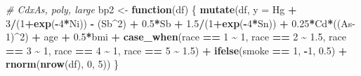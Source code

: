 \documentclass[12pt, twoside]{amherstthesis}
\newenvironment{Shaded}{\begin{snugshade}}{\end{snugshade}}
\newcommand{\AttributeTok}[1]{\textcolor[rgb]{0.13,0.29,0.53}{#1}}
\newcommand{\CommentTok}[1]{\textcolor[rgb]{0.56,0.35,0.01}{\textit{#1}}}
\newcommand{\ControlFlowTok}[1]{\textcolor[rgb]{0.13,0.29,0.53}{\textbf{#1}}}
\newcommand{\DecValTok}[1]{\textcolor[rgb]{0.00,0.00,0.81}{#1}}
\newcommand{\FloatTok}[1]{\textcolor[rgb]{0.00,0.00,0.81}{#1}}
\newcommand{\FunctionTok}[1]{\textcolor[rgb]{0.13,0.29,0.53}{\textbf{#1}}}
\newcommand{\NormalTok}[1]{#1}
\newcommand{\OtherTok}[1]{\textcolor[rgb]{0.56,0.35,0.01}{#1}}
\newcommand{\SpecialCharTok}[1]{\textcolor[rgb]{0.81,0.36,0.00}{\textbf{#1}}}
\begin{document}
\begin{Shaded}
\begin{Highlighting}[]
\CommentTok{\# CdxAs, poly, large}
\NormalTok{bp2 }\OtherTok{\textless{}{-}} \ControlFlowTok{function}\NormalTok{(df) \{}
  \FunctionTok{mutate}\NormalTok{(df, }\AttributeTok{y =} 
\NormalTok{           Hg }\SpecialCharTok{+} \DecValTok{3}\SpecialCharTok{/}\NormalTok{(}\DecValTok{1}\SpecialCharTok{+}\FunctionTok{exp}\NormalTok{(}\SpecialCharTok{{-}}\DecValTok{4}\SpecialCharTok{*}\NormalTok{Ni)) }\SpecialCharTok{{-}}\NormalTok{ (Sb}\SpecialCharTok{\^{}}\DecValTok{2}\NormalTok{) }\SpecialCharTok{+} \FloatTok{0.5}\SpecialCharTok{*}\NormalTok{Sb }\SpecialCharTok{+} \FloatTok{1.5}\SpecialCharTok{/}\NormalTok{(}\DecValTok{1}\SpecialCharTok{+}\FunctionTok{exp}\NormalTok{(}\SpecialCharTok{{-}}\DecValTok{4}\SpecialCharTok{*}\NormalTok{Sn)) }\SpecialCharTok{+} 
           \FloatTok{0.25}\SpecialCharTok{*}\NormalTok{Cd}\SpecialCharTok{*}\NormalTok{((As}\DecValTok{{-}1}\NormalTok{)}\SpecialCharTok{\^{}}\DecValTok{2}\NormalTok{) }\SpecialCharTok{+}
\NormalTok{           age }\SpecialCharTok{+} \FloatTok{0.5}\SpecialCharTok{*}\NormalTok{bmi }\SpecialCharTok{+} 
           \FunctionTok{case\_when}\NormalTok{(race }\SpecialCharTok{==} \DecValTok{1} \SpecialCharTok{\textasciitilde{}} \DecValTok{1}\NormalTok{, }
\NormalTok{                     race }\SpecialCharTok{==} \DecValTok{2} \SpecialCharTok{\textasciitilde{}} \FloatTok{1.5}\NormalTok{, }
\NormalTok{                     race }\SpecialCharTok{==} \DecValTok{3} \SpecialCharTok{\textasciitilde{}} \DecValTok{1}\NormalTok{, }
\NormalTok{                     race }\SpecialCharTok{==} \DecValTok{4} \SpecialCharTok{\textasciitilde{}} \DecValTok{1}\NormalTok{, }
\NormalTok{                     race }\SpecialCharTok{==} \DecValTok{5} \SpecialCharTok{\textasciitilde{}} \FloatTok{1.5}\NormalTok{) }\SpecialCharTok{+}
           \FunctionTok{ifelse}\NormalTok{(smoke }\SpecialCharTok{==} \DecValTok{1}\NormalTok{, }\SpecialCharTok{{-}}\DecValTok{1}\NormalTok{, }\FloatTok{0.5}\NormalTok{) }\SpecialCharTok{+}
           \FunctionTok{rnorm}\NormalTok{(}\FunctionTok{nrow}\NormalTok{(df), }\DecValTok{0}\NormalTok{, }\DecValTok{5}\NormalTok{))}
\NormalTok{\}}


\end{Highlighting}
\end{Shaded}
\end{document}
